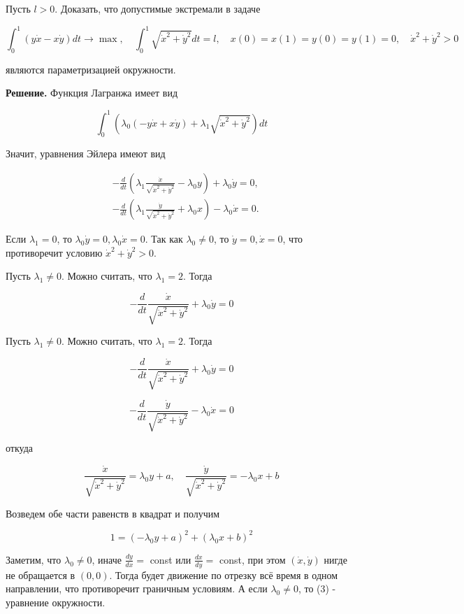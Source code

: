 Пусть $l>0$. Доказать, что допустимые экстремали в задаче

$$
\int_{0}^{1}(y \dot{x}-x \dot{y}) d t \rightarrow \max , \quad \int_{0}^{1} \sqrt{\dot{x}^{2}+\dot{y}^{2}} d t=l, \quad x(0)=x(1)=y(0)=y(1)=0, \quad \dot{x}^{2}+\dot{y}^{2}>0
$$

являются параметризацией окружности.

\textbf{Решение.} Функция Лагранжа имеет вид

$$
\int_{0}^{1}\left(\lambda_{0}(-y \dot{x}+x \dot{y})+\lambda_{1} \sqrt{\dot{x}^{2}+\dot{y}^{2}}\right) d t
$$

Значит, уравнения Эйлера имеют вид

$$
\begin{aligned}
& -\frac{d}{d t}\left(\lambda_{1} \frac{\dot{x}}{\sqrt{\dot{x}^{2}+\dot{y}^{2}}}-\lambda_{0} y\right)+\lambda_{0} \dot{y}=0, \\
& -\frac{d}{d t}\left(\lambda_{1} \frac{\dot{y}}{\sqrt{\dot{x}^{2}+\dot{y}^{2}}}+\lambda_{0} x\right)-\lambda_{0} \dot{x}=0 .
\end{aligned}
$$

Если $\lambda_{1}=0$, то $\lambda_{0} \dot{y}=0, \lambda_{0} \dot{x}=0$. Так как $\lambda_{0} \neq 0$, то $\dot{y}=0, \dot{x}=0$, что противоречит условию $\dot{x}^{2}+\dot{y}^{2}>0$.

\begin{task}
Пусть $\lambda_{1} \neq 0$. Можно считать, что $\lambda_{1}=2$. Тогда

$$
-\frac{d}{d t} \frac{\dot{x}}{\sqrt{\dot{x}^{2}+\dot{y}^{2}}}+\lambda_{0} \dot{y}=0
$$

Пусть $\lambda_{1} \neq 0$. Можно считать, что $\lambda_{1}=2$. Тогда

$$
-\frac{d}{d t} \frac{\dot{x}}{\sqrt{\dot{x}^{2}+\dot{y}^{2}}}+\lambda_{0} \dot{y}=0
$$

$$
-\frac{d}{d t} \frac{\dot{y}}{\sqrt{\dot{x}^{2}+\dot{y}^{2}}}-\lambda_{0} \dot{x}=0
$$

откуда

$$
\frac{\dot{x}}{\sqrt{\dot{x}^{2}+\dot{y}^{2}}}=\lambda_{0} y+a, \quad \frac{\dot{y}}{\sqrt{\dot{x}^{2}+\dot{y}^{2}}}=-\lambda_{0} x+b
$$

Возведем обе части равенств в квадрат и получим

$$
1=\left(-\lambda_{0} y+a\right)^{2}+\left(\lambda_{0} x+b\right)^{2}
$$

Заметим, что $\lambda_{0} \neq 0$, иначе $\frac{d y}{d x}=$ const или $\frac{d x}{d y}=$ const, при этом $(\dot{x}, \dot{y})$ нигде не обращается в $(0,0)$. Тогда будет движение по отрезку всё время в одном направлении, что противоречит граничным условиям. А если $\lambda_{0} \neq 0$, то (3) - уравнение окружности.
\end{task}